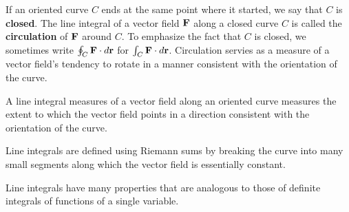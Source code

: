 If an oriented curve $C$ ends at the same point where it started, we
say that $C$ is \textbf{closed}. The line integral of a vector field
$\mathbf{F}$ along a closed curve $C$ is called the \textbf{circulation} of
$\mathbf{F}$ around $C$. To emphasize the fact that $C$ is closed, we
sometimes write $\oint_C \mathbf{F}\cdot d\mathbf{r}$ for $\int_C \mathbf{F}\cdot
d\mathbf{r}$. Circulation servies as a measure of a vector field's tendency
to rotate in a manner consistent with the orientation of the curve.






\begin{summary}
\item A line integral measures of a vector field along an oriented
  curve measures the extent to which the vector field points in a
  direction consistent with the orientation of the curve.
\item Line integrals are defined using Riemann sums by breaking the
  curve into many small segments along which the vector field is
  essentially constant.
\item Line integrals have many properties that are analogous to those
  of definite integrals of functions of a single variable.
\end{summary}

\nin \hrulefill

%

\clearpage

